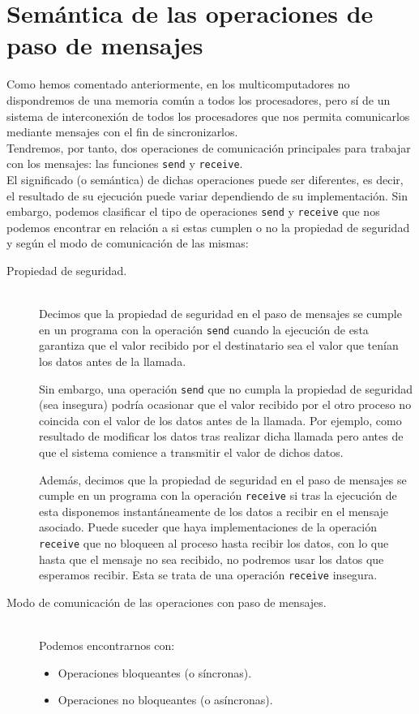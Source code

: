 \section{Semántica de las operaciones de paso de mensajes} %
Como hemos comentado anteriormente, en los multicomputadores no dispondremos de una memoria común a todos los procesadores, pero sí de un sistema de interconexión de todos los procesadores que nos permita comunicarlos mediante mensajes con el fin de sincronizarlos.\\

Tendremos, por tanto, dos operaciones de comunicación principales para trabajar con los mensajes: las funciones \verb|send| y \verb|receive|.\\

El significado (o semántica) de dichas operaciones puede ser diferentes, es decir, el resultado de su ejecución puede variar dependiendo de su implementación. Sin embargo, podemos clasificar el tipo de operaciones \verb|send| y \verb|receive| que nos podemos encontrar en relación a si estas cumplen o no la propiedad de seguridad y según el modo de comunicación de las mismas:

\begin{description}
    \item [Propiedad de seguridad.]~\\
        Decimos que la propiedad de seguridad en el paso de mensajes se cumple en un programa con la operación \verb|send| cuando la ejecución de esta garantiza que el valor recibido por el destinatario sea el valor que tenían los datos antes de la llamada.

        Sin embargo, una operación \verb|send| que no cumpla la propiedad de seguridad (sea insegura) podría ocasionar que el valor recibido por el otro proceso no coincida con el valor de los datos antes de la llamada. Por ejemplo, como resultado de modificar los datos tras realizar dicha llamada pero antes de que el sistema comience a transmitir el valor de dichos datos.

        Además, decimos que la propiedad de seguridad en el paso de mensajes se cumple en un programa con la operación \verb|receive| si tras la ejecución de esta disponemos instantáneamente de los datos a recibir en el mensaje asociado. Puede suceder que haya implementaciones de la operación \verb|receive| que no bloqueen al proceso hasta recibir los datos, con lo que hasta que el mensaje no sea recibido, no podremos usar los datos que esperamos recibir. Esta se trata de una operación \verb|receive| insegura.
    \item [Modo de comunicación de las operaciones con paso de mensajes.]~\\
        Podemos encontrarnos con:
        \begin{itemize}
            \item Operaciones bloqueantes (o síncronas).
            \item Operaciones no bloqueantes (o asíncronas).
        \end{itemize}
\end{description}

